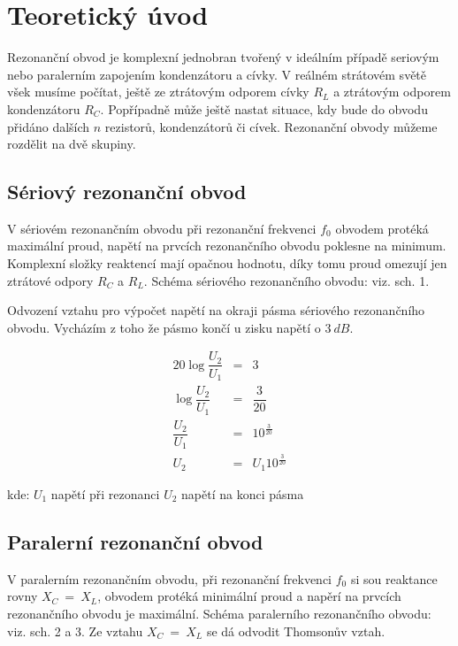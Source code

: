 \section{Teoretický úvod}
  \indent\indent
  Rezonanční obvod je komplexní jednobran tvořený v ideálním případě seriovým nebo paralerním zapojením kondenzátoru a cívky. V reálném strátovém světě všek musíme počítat, ještě ze ztrátovým odporem cívky $R_L$ a ztrátovým odporem kondenzátoru $R_C$. Popřípadně může ještě nastat situace, kdy bude do obvodu přidáno dalších $n$ rezistorů, kondenzátorů či cívek. Rezonanční obvody můžeme rozdělit na dvě skupiny.
  
  \subsection{Sériový rezonanční obvod}
    \indent\indent
    V sériovém rezonančním obvodu při rezonanční frekvenci $f_0$ obvodem protéká maximální proud, napětí na prvcích rezonančního obvodu poklesne na minimum. Komplexní složky reaktencí mají opačnou hodnotu, díky tomu proud omezují jen ztrátové odpory $R_C$ a $R_L$. Schéma sériového rezonančního obvodu: viz. sch. 1.
    
    Odvození vztahu pro výpočet napětí na okraji pásma sériového rezonančního obvodu. Vycházím z toho že pásmo končí u zisku napětí o $3~dB$.
  
  \begin{eqnarray}
      20\log\dfrac{U_2}{U_1} &=& 3 \nonumber\\
      \log \dfrac{U_2}{U_1} &=& \dfrac{3}{20} \nonumber\\
      \dfrac{U_2}{U_1} &=& 10^{\frac{3}{20}} \nonumber\\
      U_2 &=& U_1 10^{\frac{3}{20}}
    \end{eqnarray}
    
    \hspace*{2cm}kde:\newline    
    \hspace*{4cm}$U_1$ \dotfill napětí při rezonanci\hspace*{4cm}\newline
    \hspace*{4cm}$U_2$ \dotfill napětí na konci pásma\hspace*{4cm}\newline
    
  \subsection{Paralerní rezonanční obvod}
    \indent\indent
    V paralerním rezonančním obvodu, při rezonanční frekvenci $f_0$ si sou reaktance rovny $X_C~=~X_L$, obvodem protéká minimální proud a napěrí na prvcích rezonančního obvodu je maximální.  Schéma paralerního rezonančního obvodu: viz. sch. 2 a 3. Ze vztahu $X_C~=~X_L$ se dá odvodit Thomsonův vztah.
    

